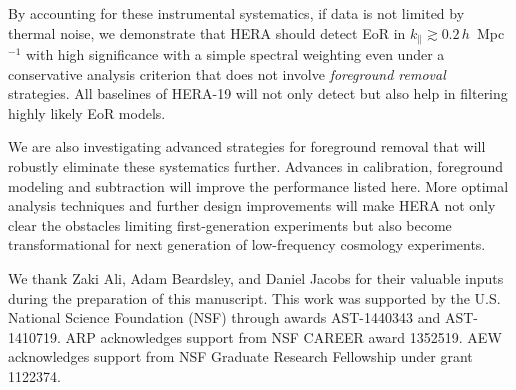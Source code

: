 \documentclass[preprint2,iop,numberedappendix,twocolappendix,appendixfloats]{emulateapj}
\begin{document}
By accounting for these instrumental systematics, if data is not limited by thermal noise, we demonstrate that HERA should detect EoR in $k_\parallel\gtrsim 0.2\,h$~Mpc$^{-1}$ with high significance with a simple spectral weighting even under a conservative analysis criterion that does not involve {\it foreground removal} strategies. All baselines of HERA-19 will not only detect but also help in filtering highly likely EoR models. 

We are also investigating advanced strategies for foreground removal that will robustly eliminate these systematics further. Advances in calibration, foreground modeling and subtraction will improve the performance listed here. More optimal analysis techniques and further design improvements will make HERA not only clear the obstacles limiting first-generation experiments but also become transformational for next generation of low-frequency cosmology experiments.

\acknowledgments

We thank Zaki Ali, Adam Beardsley, and Daniel Jacobs for their valuable inputs during the preparation of this manuscript. This work was supported by the U.S. National Science Foundation (NSF) through awards AST-1440343 and AST-1410719. ARP acknowledges support from NSF CAREER award 1352519. AEW acknowledges support from NSF Graduate Research Fellowship under grant 1122374.

\end{document}
